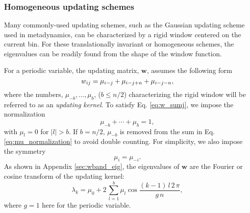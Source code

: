 \documentclass[reprint, superscriptaddress, floatfix]{revtex4-1}
\begin{document}
\subsubsection{\label{sec:band-matrix}
Homogeneous updating schemes}



Many commonly-used updating schemes,
such as the Gaussian updating scheme
used in metadynamics,
can be characterized by a rigid window
centered on the current bin.
%
For these translationally invariant or homogeneous
schemes, the eigenvalues can be readily found
from the shape of the window function.
%









For a periodic variable\cite{dama2014},
the updating matrix, $\mathbf w$,
assumes the following form
%
\begin{equation}
  w_{ij}
  =
  \mu_{i-j}
  +
  \mu_{i-j+n}
  +
  \mu_{i-j-n}
  ,
\notag
\end{equation}
%
where the numbers,
$\mu_{-b}, \dots, \mu_b$, ($b \le n/2$)
characterizing the rigid window
will be referred to as an \emph{updating kernel}\cite{bussi2006}.
%
To satisfy Eq. \eqref{eq:w_sumj},
we impose the normalization
%
\begin{equation}
  \mu_{-b} + \cdots + \mu_b = 1
  ,
\label{eq:mu_normalization}
\end{equation}
%
with $\mu_l = 0$ for $|l| > b$.
%
If $b = n/2$, $\mu_{-b}$ is removed
from the sum in Eq. \eqref{eq:mu_normalization}
to avoid double counting.
%
For simplicity, we also impose the symmetry
%
\begin{equation}
  \mu_i = \mu_{-i}
  .
\label{eq:mu_symm}
\end{equation}
%
As shown in Appendix \ref{sec:wband_eig},
the eigenvalues of $\mathbf w$ are
the Fourier or cosine transform of the updating kernel:
%
\begin{equation}
  \lambda_k
  =
  \mu_0
  +
  2 \,
  \sum_{ l = 1 }^b
  \mu_l
  \cos
  \frac{ (k - 1) \, l \, 2 \, \pi }
       {            g \, n        }
  ,
  \label{eq:wband_eigenvalue}
\end{equation}
%
where $g = 1$ here for the periodic variable.
\end{document}
